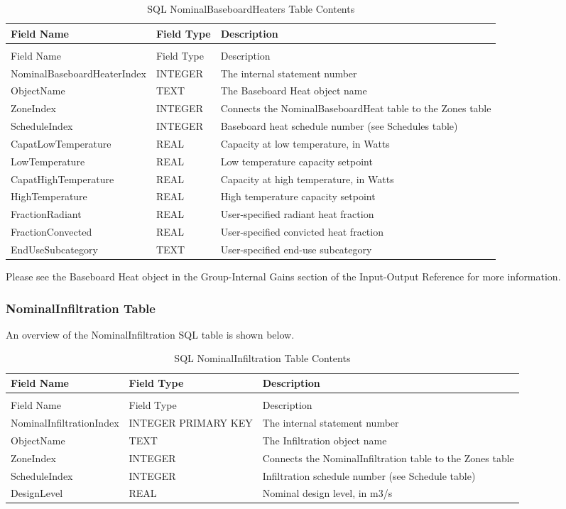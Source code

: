 \begin{longtable}[c]{>{\raggedright}p{1.5in}>{\raggedright}p{1.5in}>{\raggedright}p{2.99in}}
\caption{SQL NominalBaseboardHeaters Table Contents \label{table:table-22.-sql-nominalbaseboardheaters-table}} \tabularnewline
\toprule 
Field Name & Field Type & Description \tabularnewline
\midrule
\endfirsthead

\caption[]{SQL NominalBaseboardHeaters Table Contents} \tabularnewline
\toprule 
Field Name & Field Type & Description \tabularnewline
\midrule
\endhead

Nominal\-Baseboard\-Heater\-Index & INTEGER & The internal statement number \tabularnewline
ObjectName & TEXT & The Baseboard Heat object name \tabularnewline
ZoneIndex & INTEGER & Connects the NominalBaseboardHeat table to the Zones table \tabularnewline
ScheduleIndex & INTEGER & Baseboard heat schedule number (see Schedules table) \tabularnewline
Capat\-Low\-Temperature & REAL & Capacity at low temperature, in Watts \tabularnewline
LowTemperature & REAL & Low temperature capacity setpoint \tabularnewline
Capat\-High\-Temperature & REAL & Capacity at high temperature, in Watts \tabularnewline
HighTemperature & REAL & High temperature capacity setpoint \tabularnewline
FractionRadiant & REAL & User-specified radiant heat fraction \tabularnewline
FractionConvected & REAL & User-specified convicted heat fraction \tabularnewline
EndUseSubcategory & TEXT & User-specified end-use subcategory \tabularnewline
\bottomrule
\end{longtable}

Please see the Baseboard Heat object in the Group-Internal Gains section of the Input-Output Reference for more information.

\subsubsection{NominalInfiltration Table}

An overview of the NominalInfiltration SQL table is shown below.

\begin{longtable}[c]{>{\raggedright}p{1.5in}>{\raggedright}p{1.5in}>{\raggedright}p{3.0in}}
\caption{SQL NominalInfiltration Table Contents \label{table:table-23.-sql-nominalinfiltration-table}} \tabularnewline
\toprule 
Field Name & Field Type & Description \tabularnewline
\midrule
\endfirsthead

\caption[]{SQL NominalInfiltration Table Contents} \tabularnewline
\toprule 
Field Name & Field Type & Description \tabularnewline
\midrule
\endhead

Nominal\-Infiltration\-Index & INTEGER PRIMARY KEY & The internal statement number \tabularnewline
ObjectName & TEXT & The Infiltration object name \tabularnewline
ZoneIndex & INTEGER & Connects the NominalInfiltration table to the Zones table \tabularnewline
ScheduleIndex & INTEGER & Infiltration schedule number (see Schedule table) \tabularnewline
DesignLevel & REAL & Nominal design level, in m3/s \tabularnewline
\bottomrule
\end{longtable}

